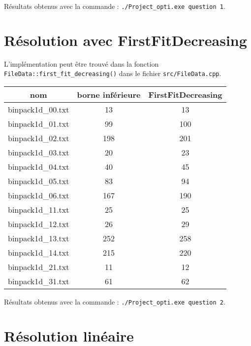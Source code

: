 \documentclass[10pt,a4paper]{article}
\begin{document}
Résultats obtenus avec la commande : \texttt{./Project\_opti.exe question 1}.

\section{Résolution avec FirstFitDecreasing}

L'implémentation peut être trouvé dans la fonction \texttt{FileData::first\_fit\_decreasing()} dans le fichier \texttt{src/FileData.cpp}.

\begin{center}
  \begin{tabular}{ | c | c | c | }  \hline
    nom               & borne inférieure & FirstFitDecreasing \\ \hline
    binpack1d\_00.txt & 13               & 13                 \\ \hline
    binpack1d\_01.txt & 99               & 100                \\ \hline
    binpack1d\_02.txt & 198              & 201                \\ \hline
    binpack1d\_03.txt & 20               & 23                 \\ \hline
    binpack1d\_04.txt & 40               & 45                 \\ \hline
    binpack1d\_05.txt & 83               & 94                 \\ \hline
    binpack1d\_06.txt & 167              & 190                \\ \hline
    binpack1d\_11.txt & 25               & 25                 \\ \hline
    binpack1d\_12.txt & 26               & 29                 \\ \hline
    binpack1d\_13.txt & 252              & 258                \\ \hline
    binpack1d\_14.txt & 215              & 220                \\ \hline
    binpack1d\_21.txt & 11               & 12                 \\ \hline
    binpack1d\_31.txt & 61               & 62                 \\ \hline
  \end{tabular}
\end{center}

Résultats obtenus avec la commande : \texttt{./Project\_opti.exe question 2}.

\pagebreak
\section{Résolution linéaire}
\end{document}
